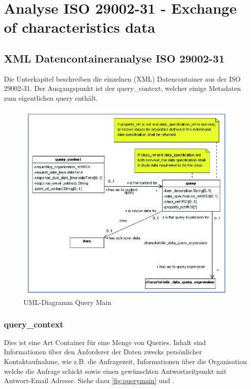 \section{Analyse ISO 29002-31 - Exchange of characteristics data}


\subsection{XML Datencontaineranalyse ISO 29002-31}
Die Unterkapitel beschreiben die einzelnen (XML) Datencontainer aus der ISO 29002-31. Der Ausgangspunkt ist der query\_context, welcher einige Metadaten zum eigentlichen query enthält. 

\begin{figure}[htbp]
	\centering
		\includegraphics[width=0.99\textwidth]{images/query_main.jpg}
		\caption[UML-Diagramm Query Main]{UML-Diagramm Query Main\footnotemark}
	\label{fig:querymain}
\end{figure}

\subsubsection{query\_context}
Dies ist eine Art Container für eine Menge von Queries. Inhalt sind Informationen über den Anforderer der Daten zwecks persönlicher Kontaktaufnahme, wie z.B. die Anfragezeit, Informationen über die Organisation welche die Anfrage schickt sowie einen gewünschten Antwortzeitpunkt mit Antwort-Email Adresse. Siehe dazu \autoref{fig:querymain} und \citep[Kap. 5.2.2][]{iso29002-31}.  

